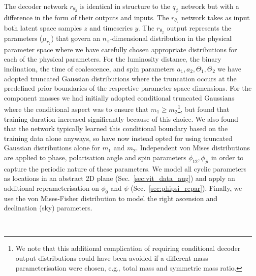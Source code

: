 %
%
The decoder network $r_{\theta_2}$ is identical in structure to the 
$q_{\phi}$ network but with a difference in the form of their 
outputs and inputs. The $r_{\theta_2}$ network takes as input both 
latent space samples $z$ and timeseries $y$. The $r_{\theta_2}$ output 
represents the parameters ($\mu_{r_2}$) that govern an 
$n_x$-dimensional distribution in the physical parameter space 
where we have carefully chosen appropriate distributions for each 
of the physical parameters. For the  
luminosity distance, the binary 
inclination, the time of coalescence, and spin 
parameters $a_1,a_2,\Theta_1,\Theta_2$ we have adopted truncated 
Gaussian distributions where the truncation occurs at the predefined 
prior boundaries of the respective parameter space dimensions. For the 
component masses we had initially adopted conditional truncated Gaussians where 
the conditional aspect was to ensure that 
$m_{1}\geq m_{2}$\footnote{We note that 
this additional complication of requiring conditional 
decoder output distributions could have been avoided if a 
different mass parameterisation were chosen, e.g., total mass and 
symmetric mass ratio.}, but found that training duration increased significantly 
because of this choice. We also found that the network typically learned
this conditional boundary based on the training data alone anyways, so have now 
instead opted for using truncated Gaussian distributions alone for 
$m_1$ and $m_2$. 
Independent von Mises distributions are applied to 
phase, polarisation angle and spin parameters $\phi_{12},\phi_{jl}$ in 
order to capture the periodic nature of these parameters. We 
model all cyclic parameters as locations in an abstract 2D plane (Sec.~\ref{sec:vit_data_aug}) 
and apply an additional reprameterisation on $\phi_0$ and $\psi$
(Sec.~\ref{sec:phipsi_repar}). Finally, we 
use the von Mises-Fisher distribution to model the right ascension 
and declination (sky) parameters.

~    

